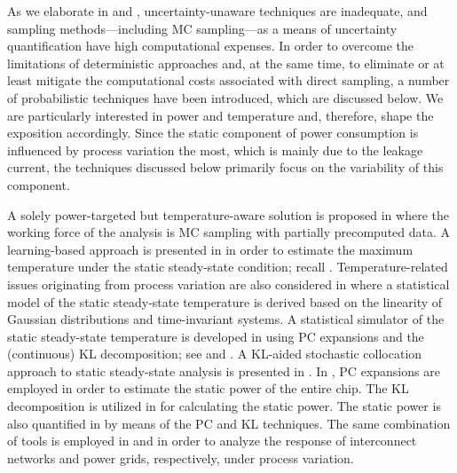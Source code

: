 As we elaborate in  and , uncertainty-unaware
techniques are inadequate, and sampling methods---including \ac{MC}
sampling---as a means of uncertainty quantification have high computational
expenses. In order to overcome the limitations of deterministic approaches and,
at the same time, to eliminate or at least mitigate the computational costs
associated with direct sampling, a number of probabilistic techniques have been
introduced, which are discussed below. We are particularly interested in power
and temperature and, therefore, shape the exposition accordingly. Since the
static component of power consumption is influenced by process variation the
most, which is mainly due to the leakage current, the techniques discussed below
primarily focus on the variability of this component.

A solely power-targeted but temperature-aware solution is proposed in
\cite{chandra2010} where the working force of the analysis is \ac{MC} sampling
with partially precomputed data. A learning-based approach is presented in
\cite{juan2011} in order to estimate the maximum temperature under the static
steady-state condition; recall .
Temperature-related issues originating from process variation are also
considered in \cite{juan2012} where a statistical model of the static
steady-state temperature is derived based on the linearity of Gaussian
distributions and time-invariant systems. A statistical simulator of the static
steady-state temperature is developed in \cite{huang2009a} using \ac{PC}
expansions and the (continuous) \ac{KL} decomposition; see
 and . A \ac{KL}-aided
stochastic collocation \cite{maitre2010, xiu2010} approach to static
steady-state analysis is presented in \cite{lee2013}. In \cite{shen2009},
\ac{PC} expansions are employed in order to estimate the static power of the
entire chip. The \ac{KL} decomposition is utilized in \cite{bhardwaj2006} for
calculating the static power. The static power is also quantified in
\cite{bhardwaj2008} by means of the \ac{PC} and \ac{KL} techniques. The same
combination of tools is employed in \cite{vrudhula2006} and \cite{ghanta2006} in
order to analyze the response of interconnect networks and power grids,
respectively, under process variation.

